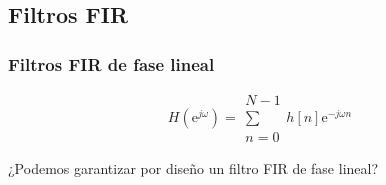\documentclass[handout]{beamer}
\author[J. Chacón]{%
\textit{Ingeniería Electrónica de Comunicaciones }\\
\vspace{0.6cm}
\small Jesús Chacón Sombría}%
\institute[DACYA. UCM] %
{

\footnotesize  Departamento de Arquitectura de Computadores y Automática.\\
  Universidad Complutense de Madrid
  }
\date[Diseño de filtros] %
{\footnotesize Curso 2025-2026}%
\newcommand{\MyLogo}{%
\begin{textblock}{14}(116.0,0.6)
  \pgfuseimage{logo}
\end{textblock}
}
\numberwithin{section}{part}
\begin{document}
\begin{frame}
  \titlepage
\end{frame}

\newcommand*\oldmacro{}%
\let\oldmacro\insertshorttitle%
\renewcommand*\insertshorttitle{%
 \MyLogo
  \oldmacro\hfill%
}

\AtBeginSection[]{}
\AtBeginSubsection[]{}

\subsection{Filtros FIR}

\begin{frame}
  \frametitle{Filtros FIR de fase lineal}
  \[
  H(\mathrm{e}^{j\omega})=\substack{N-1\\\sum\\n=0}h[n]\mathrm{e}^{-j\omega n}
  \]
  \vspace{0.1cm}

  \alert{¿Podemos garantizar por diseño un filtro FIR de fase lineal?}
  

\end{frame}
\end{document}

